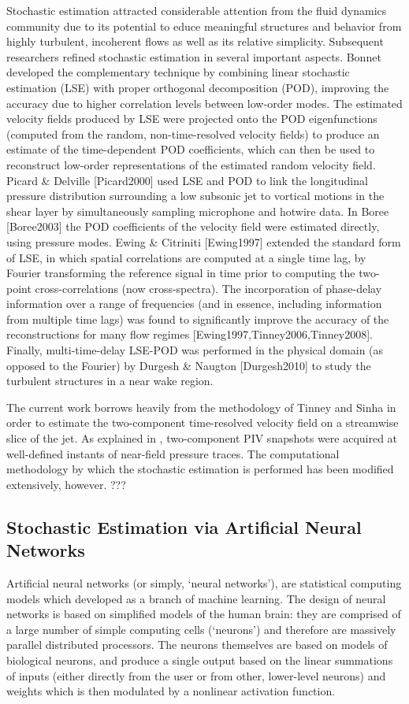 Stochastic estimation attracted considerable attention from the fluid dynamics community due to its potential to educe meaningful structures and behavior from highly turbulent, incoherent flows as well as its relative simplicity.
Subsequent researchers refined stochastic estimation in several important aspects.
Bonnet \etal [Bonnet1994] developed the complementary technique by combining linear stochastic estimation (LSE) with proper orthogonal decomposition (POD), improving the accuracy due to higher correlation levels between low-order modes.
The estimated velocity fields produced by LSE were projected onto the POD eigenfunctions (computed from the random, non-time-resolved velocity fields) to produce an estimate of the time-dependent POD coefficients, which can then be used to reconstruct low-order representations of the estimated random velocity field.
Picard \& Delville [Picard2000] used LSE and POD to link the longitudinal pressure distribution surrounding a low subsonic jet to vortical motions in the shear layer by simultaneously sampling microphone and hotwire data.
In Boree [Boree2003] the POD coefficients of the velocity field were estimated directly, using pressure modes.
Ewing \& Citriniti [Ewing1997] extended the standard form of LSE, in which spatial correlations are computed at a single time lag, by Fourier transforming the reference signal in time prior to computing the two-point cross-correlations (now cross-spectra). 
The incorporation of phase-delay information over a range of frequencies (and in essence, including information from multiple time lags) was found to significantly improve the accuracy of the reconstructions for many flow regimes [Ewing1997,Tinney2006,Tinney2008].
Finally, multi-time-delay LSE-POD was performed in the physical domain (as opposed to the Fourier) by Durgesh \& Naugton [Durgesh2010] to study the turbulent structures in a near wake region.

The current work borrows heavily from the methodology of Tinney \etal [TinneyJFM2008] and Sinha \etal [SinhaIJFC2010] in order to estimate the two-component time-resolved velocity field on a streamwise slice of the jet.
As explained in , two-component PIV snapshots were acquired at well-defined instants of near-field pressure traces.
The computational methodology by which the stochastic estimation is performed has been modified extensively, however.
???  
\subsection{Stochastic Estimation via Artificial Neural Networks}
Artificial neural networks (or simply, `neural networks'), are statistical computing models which developed as a branch of machine learning.
The design of neural networks is based on simplified models of the human brain: they are comprised of a large number of simple computing cells (`neurons') and therefore are massively parallel distributed processors.
The neurons themselves are based on models of biological neurons, and produce a single output based on the linear summations of inputs (either directly from the user or from other, lower-level neurons) and weights which is then modulated by a nonlinear activation function.


